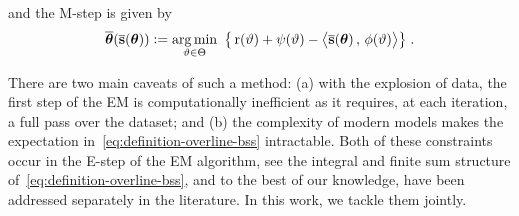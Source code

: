 \documentclass[bj]{imsart}
\numberwithin{equation}{section}
\theoremstyle{plain}
\begin{document}
and the {M-step} is given by
\begin{align}\label{eq:mstep}
\overline{\param}( \overline{\bss}(\param) ) \eqdef \argmin_{ \vartheta \in \Param } ~\big\{ \Pen( \vartheta ) + \psi( \vartheta) - \pscal{ \overline{\bss}(\param)}{ \phi ( \vartheta) } \big\} \eqsp.
\end{align}


There are two main caveats of such a method: {(a)} with the explosion of data, the first step of the EM is computationally inefficient as it requires, at each iteration, a full pass over the dataset; and {(b)} the complexity of modern  models makes the expectation in~\eqref{eq:definition-overline-bss} intractable. 
Both of these constraints occur in the E-step of the EM algorithm, see the integral and finite sum structure of~\eqref{eq:definition-overline-bss}, and to the best of our knowledge, have been addressed separately in the literature. 
In this work, we tackle them jointly.
\end{document}
